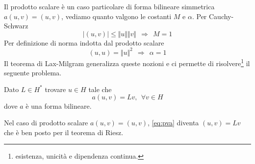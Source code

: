 Il prodotto scalare è un caso particolare di forma bilineare simmetrica $a(u,v) =(u,v)$, vediamo quanto valgono le costanti $M$ e $\alpha $. Per Cauchy-Schwarz
\begin{equation*}
    | (u,v)| \leq \Vert u\Vert \Vert v\Vert \ \ \Rightarrow \ \ M=1
\end{equation*}
Per definizione di norma indotta dal prodotto scalare
\begin{equation*}
    (u,u) =\Vert u\Vert ^{2} \ \ \Rightarrow \ \ \alpha =1
\end{equation*}
Il teorema di Lax-Milgram generalizza queste nozioni e ci permette di risolvere\footnote{esistenza, unicità e dipendenza continua.} il seguente problema.
\begin{definition}
     Dato $L\in H^{*}$ trovare $u\in H$ tale che
    \begin{equation}
        \tag{PVA}
        a(u,v) =Lv,\ \ \forall v\in H
        \label{eq:pva}
    \end{equation}
    dove $a$ è una forma bilineare.
\end{definition}
Nel caso di prodotto scalare $a(u,v) =(u,v)$, \eqref{eq:pva} diventa $(u,v) =Lv$ che è ben posto per il teorema di Riesz.

